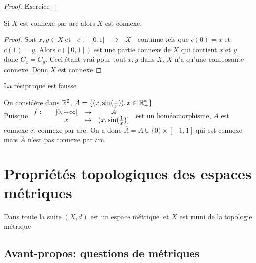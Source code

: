 \documentclass[]{report}
\begin{document}
    \begin{proof}
        Exercice
    \end{proof}

    \begin{prop}{}{}
        Si $X$ est connexe par arc alors $X$ est connexe.
    \end{prop}

    \begin{proof}
        Soit $x,y\in X$ et $\begin{array}{ccccc} c : & [0,1] & \to & X \end{array}$ continue tels que $c(0)=x$ et $c(1)=y$. Alors $c([0,1])$ est une partie connexe de $X$ qui contient $x$ et $y$ donc $C_x=C_y$. Ceci étant vrai pour tout $x,y$ dans $X$, $X$ n'a qu'une composante connexe. Donc $X$ est connexe
    \end{proof}

    \begin{re}{}{}
        La réciproque est fausse
    \end{re}

    \begin{ex}{}{}
        On considère dans $\mathbb{R}^2$, $A=\{(x,\sin(\frac{1}{x})),x\in \mathbb{R}_+^*\}$\\
        Puisque $\begin{array}{ccccc} f : & & ]0,+\infty[ & \to & A \\ & & x & \mapsto & (x,\sin(\frac{1}{x})) \end{array}$ est un homéomorphisme, $A$ est connexe et connexe par arc. On a donc $\overline{A}=A\cup\{0\}\times[-1,1]$ qui est connexe mais $\overline{A}$ n'est pas connexe par arc.
    \end{ex}

    \chapter{Propriétés topologiques des espaces métriques}

    Dans toute la suite $(X,d)$ est un espace métrique, et $X$ est muni de la topologie métrique
    
    \section{Avant-propos: questions de métriques}
\end{document}
